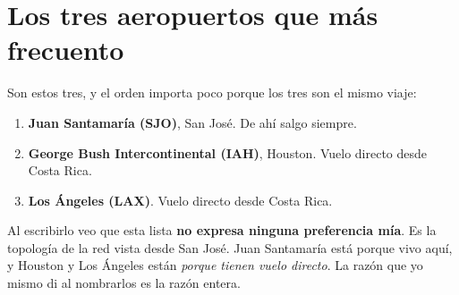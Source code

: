 \documentclass[11pt,letterpaper]{article}
\begin{document}
\section{Los tres aeropuertos que más frecuento}

Son estos tres, y el orden importa poco porque los tres son el mismo viaje:

\begin{enumerate}
\item \textbf{Juan Santamaría (SJO)}, San José. De ahí salgo siempre.
\item \textbf{George Bush Intercontinental (IAH)}, Houston. Vuelo directo
  desde Costa Rica.
\item \textbf{Los Ángeles (LAX)}. Vuelo directo desde Costa Rica.
\end{enumerate}

Al escribirlo veo que esta lista \textbf{no expresa ninguna preferencia mía}.
Es la topología de la red vista desde San José. Juan Santamaría está porque
vivo aquí, y Houston y Los Ángeles están \emph{porque tienen vuelo directo}. La
razón que yo mismo di al nombrarlos es la razón entera.
\end{document}
